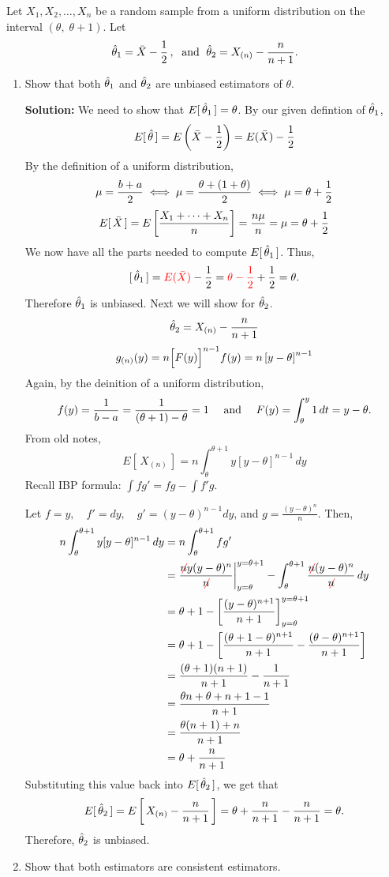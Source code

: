 Let $X_1, X_2, \dots, X_n$ be a random sample from a uniform distribution on the interval $(\theta,\;\theta+1)$. Let
$$\that_1 = \xbar - \over{2} \,, \; \text{ and } \; \that_2 = X_{(n)} - \frac{n}{n+1}.$$
\begin{enumerate}[label=({\alph*})]
    \item Show that both $\that_1$ and $\that_2$ are unbiased estimators of $\theta$.
    
    \nnl \textbf{Solution: } We need to show that $E[\,\that_1\,] = \theta$. By our given defintion of $\that_1$,
    $$E[\,\that\,] = E\pars{\xbar - \over{2}} = E(\xbar) - \over{2}$$
    By the definition of a uniform distribution, 
    $$\mu = \frac{b+a}{2} \iff \mu = \frac{\theta + (1 + \theta)}{2} \iff \mu = \theta + \over{2}$$
    $$E[\,\xbar\,] = E\brac{\frac{\sumthru{X}}{n}} = \frac{n\mu}{n} = \mu = \theta + \over{2}$$
    We now have all the parts needed to compute $E[\,\that_1\,]$. Thus,
    $$[\,\that_1\,] = \red{E(\xbar)} - \over{2} = \red{\theta - \over{2}} + \over{2} = \theta.$$
    Therefore $\that_1$ is unbiased. Next we will show for $\that_2$.
    $$\that_2 = X_{(n)} - \frac{n}{n+1}$$
    $$g_{(n)}(y) = n \Big[F(y)\Big]^{n-1}f(y) = n\brac{y-\theta}^{n-1}$$
    Again, by the deinition of a uniform distribution,
    $$f(y) = \over{b-a} = \frac{1}{(\theta + 1) - \theta} = 1 \quad \text{ and } \quad F(y) = \int_{\theta}^y 1\,dt = y - \theta.$$
    From old notes,
    $$E[\,X_{(n)}\,] = n \int_{\theta}^{\theta + 1} y [y-\theta]^{n-1}\,dy$$
    \newpage 
    Recall IBP formula: $\int f g' = fg - \int f' g$.
    
    \nl Let $f = y, \quad f' = dy, \quad g' = (y - \theta)^{n-1}dy$, and $g = \frac{(y-\theta)^n}{n}$. Then,
    \begin{align*}
        n \int_{\theta}^{\theta + 1} y [y-\theta]^{n-1}\,dy &= n \int_{\theta}^{\theta + 1} fg'\\
        &= \frac{\red{\not}ny(y-\theta)^n}{\red{\not}n} \bigg|_{y=\theta}^{y=\theta+1} - \int_{\theta}^{\theta + 1} \frac{\red{\not}n(y-\theta)^n}{\red{\not}n} \,dy\\
        &= \theta+1 - \brac{\frac{(y-\theta)^{n+1}}{n+1} }_{y=\theta}^{y=\theta + 1}\\
        &= \theta+1 - \brac{\frac{(\theta + 1 - \theta)^{n+1}}{n+1} - \frac{(\theta-\theta)^{n+1}}{n+1} }\\
        &= \frac{(\theta+1)(n+1)}{n+1} - \frac{1}{n+1}\\
        &= \frac{\theta n + \theta + n + 1 - 1}{n+1}\\
        &= \frac{\theta(n+1) + n}{n+1}\\
        &= \theta + \frac{n}{n+1}
    \end{align*}
    Substituting this value back into $E[\,\that_2\,]$, we get that
    $$E[\,\that_2\,] = E\brac{\,X_{(n)} - \frac{n}{n+1}\,} = \theta + \frac{n}{n+1} - \frac{n}{n+1} = \theta.$$
    Therefore, $\that_2$ is unbiased.
    \vspace{0.4in}
    \item Show that both estimators are consistent estimators.
    

\end{enumerate}
